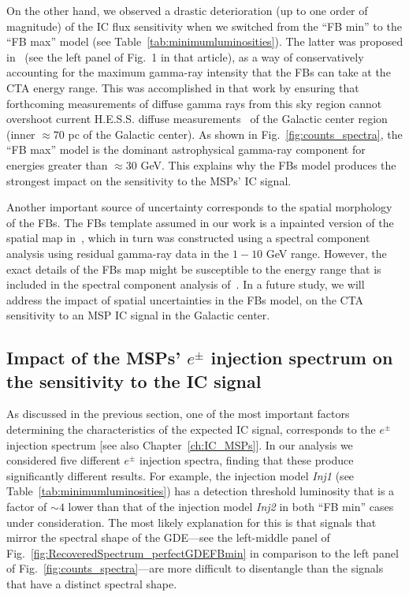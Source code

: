 \documentclass[doublespace,nopageskip]{VTthesis}
\begin{document}
On the other hand, we observed a drastic deterioration (up to one order of magnitude) of the IC flux  sensitivity when we switched from the ``FB min'' to the ``FB max'' model (see Table~\ref{tab:minimumluminosities}). 
The latter was proposed in~\cite{2021PhRvD.103b3011R} (see the left panel of Fig.~1 in that article), as a way of conservatively accounting for the maximum gamma-ray intensity that the FBs can take at the CTA energy range. This was accomplished in that work by ensuring that forthcoming measurements of diffuse gamma rays from this sky region cannot overshoot current H.E.S.S. diffuse measurements~\citep{2016Natur.531..476H} of the Galactic center region (inner $\approx 70$ pc of the Galactic center). As shown in Fig.~\ref{fig:counts_spectra}, the ``FB max'' model is the dominant astrophysical gamma-ray component for energies greater than $\approx 30$ GeV. This explains why the FBs model produces the strongest impact on the sensitivity to the MSPs' IC signal.

Another important source of uncertainty corresponds to the spatial morphology of the FBs. The FBs template assumed in our work is a inpainted version of the spatial map in~\cite{2017ApJ...840...43A}, which in turn was constructed using a spectral component analysis using residual gamma-ray data in the $1-10$ GeV range. However, the exact details of the FBs map might be susceptible to the energy range that is included in the spectral component analysis of~\cite{2017ApJ...840...43A}. In a future study, we will address the impact of spatial uncertainties in the FBs model, on the CTA sensitivity to an MSP IC signal in the Galactic center.  

\subsection{Impact of the MSPs' $e^\pm$ injection spectrum on the sensitivity to the IC signal}

As discussed in the previous section, one of the most important factors determining the characteristics of the expected IC signal, corresponds to the $e^\pm$ injection spectrum [see also Chapter~\ref{ch:IC_MSPs}]. In our analysis we  considered five different $e^\pm$ injection spectra, finding that these produce significantly different results. For example, the injection model \textit{Inj1} (see Table~\ref{tab:minimumluminosities}) has a detection threshold luminosity that is a factor of $\sim 4$
lower than that of the injection model \textit{Inj2} in both ``FB min'' cases under consideration. The most likely explanation for this is that signals that mirror the spectral shape of the GDE---see the left-middle panel of Fig.~\ref{fig:RecoveredSpectrum_perfectGDEFBmin} in comparison to the left panel of Fig.~\ref{fig:counts_spectra}---are more difficult
to disentangle than the signals that have a distinct spectral shape.
\end{document}
